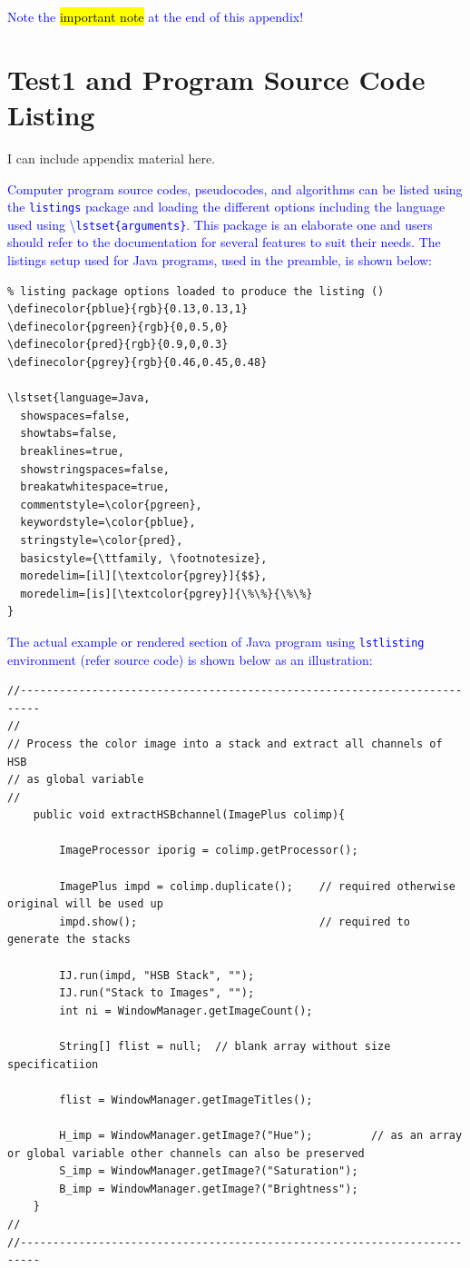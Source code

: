 \documentclass[phd]{ndsu-thesis-2022}
\newcommand\italk[1]{\textcolor{blue}{#1}}  %
\newcommand\cmd[1]{\textbackslash\texttt{#1}}  %
\newcommand\vb[1]{\textcolor{blue}{\texttt{#1}}}%
\begin{document}
\italk{Note the \hl{important note} at the end of this appendix!}

\kant[3]

\section{Test1 and Program Source Code Listing}
I can include appendix material here. \kant[9] 

\italk{Computer program source codes, pseudocodes, and algorithms can be listed using the \vb{listings} package and loading the different options including the language used using \cmd{lstset\{arguments\}}. This package is an elaborate one and users should refer to the documentation for several features to suit their needs. The listings setup used for Java programs, used in the preamble, is shown below:}

{\small
\singlespacing
\begin{verbatim}
% listing package options loaded to produce the listing ()
\definecolor{pblue}{rgb}{0.13,0.13,1}
\definecolor{pgreen}{rgb}{0,0.5,0}
\definecolor{pred}{rgb}{0.9,0,0.3}
\definecolor{pgrey}{rgb}{0.46,0.45,0.48}

\lstset{language=Java, 
  showspaces=false,
  showtabs=false,
  breaklines=true,
  showstringspaces=false,
  breakatwhitespace=true,
  commentstyle=\color{pgreen},
  keywordstyle=\color{pblue},
  stringstyle=\color{pred},
  basicstyle={\ttfamily, \footnotesize},
  moredelim=[il][\textcolor{pgrey}]{$$},
  moredelim=[is][\textcolor{pgrey}]{\%\%}{\%\%}
}
\end{verbatim}
}



\italk{The actual example or rendered section of Java program using \vb{lstlisting} environment (refer source code) is shown below as an illustration:}

{\singlespacing
\begin{lstlisting}
//-------------------------------------------------------------------------
//
// Process the color image into a stack and extract all channels of HSB 
// as global variable
//
	public void extractHSBchannel(ImagePlus colimp){

		ImageProcessor iporig = colimp.getProcessor();
		
		ImagePlus impd = colimp.duplicate();	// required otherwise original will be used up
		impd.show();						    // required to generate the stacks
		
		IJ.run(impd, "HSB Stack", "");
		IJ.run("Stack to Images", "");
		int ni = WindowManager.getImageCount();

		String[] flist = null;  // blank array without size specificatiion

		flist = WindowManager.getImageTitles();
		
		H_imp = WindowManager.getImage?("Hue");			// as an array or global variable other channels can also be preserved
		S_imp = WindowManager.getImage?("Saturation");
		B_imp = WindowManager.getImage?("Brightness");
	}	
//
//-------------------------------------------------------------------------	
\end{lstlisting}
}
\end{document}
